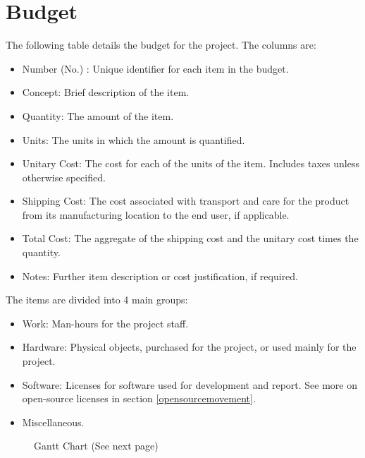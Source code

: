\section{Budget}
The following table details the budget for the project. The columns are:
\begin{itemize}
	\item Number (No.) : Unique identifier for each item in the budget.
	\item Concept: Brief description of the item.
	\item Quantity: The amount of the item.
	\item Units: The units in which the amount is quantified.
	\item Unitary Cost: The cost for each of the units of the item. Includes taxes unless otherwise specified.
	\item Shipping Cost: The cost associated with transport and care for the product from its manufacturing location to the 
	end user, if applicable.
	\item Total Cost: The aggregate of the shipping cost and the unitary cost times the quantity.
	\item Notes: Further item description or cost justification, if required.
\end{itemize}
The items are divided into 4 main groups:
\begin{itemize}
	\item Work: Man-hours for the project staff.
	\item Hardware: Physical objects, purchased for the project, or used mainly for the project.
	\item Software: Licenses for software used for development and report. See more on open-source licenses in section 
	\ref{opensourcemovement}.
	\item Miscellaneous.
\end{itemize}
\begin{figure}[H]
\caption{Gantt Chart (See next page)\label{budget}}
\end{figure}

